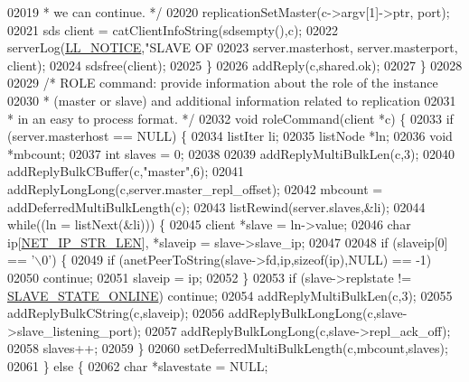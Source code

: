 \begin{DoxyCode}
{{{{{{{{{{{{{{{{{{{{{{{{{{{{{{{{{{{{{{{{{{{{{{{{{{{{{{{{{{{{{{{{{{{{{{{{02019 \textcolor{comment}{         * we can continue. */}
02020         replicationSetMaster(c->argv[1]->ptr, port);
02021         sds client = catClientInfoString(sdsempty(),c);
02022         serverLog(\hyperlink{server_8h_a8c54c191e436c7dd3012167212692401}{LL\_NOTICE},\textcolor{stringliteral}{"SLAVE OF %
02023             server.masterhost, server.masterport, client);
02024         sdsfree(client);
02025     \}
02026     addReply(c,shared.ok);
02027 \}
02028 
02029 \textcolor{comment}{/* ROLE command: provide information about the role of the instance}
02030 \textcolor{comment}{ * (master or slave) and additional information related to replication}
02031 \textcolor{comment}{ * in an easy to process format. */}
02032 \textcolor{keywordtype}{void} roleCommand(client *c) \{
02033     \textcolor{keywordflow}{if} (server.masterhost == NULL) \{
02034         listIter li;
02035         listNode *ln;
02036         \textcolor{keywordtype}{void} *mbcount;
02037         \textcolor{keywordtype}{int} slaves = 0;
02038 
02039         addReplyMultiBulkLen(c,3);
02040         addReplyBulkCBuffer(c,\textcolor{stringliteral}{"master"},6);
02041         addReplyLongLong(c,server.master\_repl\_offset);
02042         mbcount = addDeferredMultiBulkLength(c);
02043         listRewind(server.slaves,&li);
02044         \textcolor{keywordflow}{while}((ln = listNext(&li))) \{
02045             client *slave = ln->value;
02046             \textcolor{keywordtype}{char} ip[\hyperlink{server_8h_ad97c5405ed22a94e9fcc10fba577d6c0}{NET\_IP\_STR\_LEN}], *slaveip = slave->slave\_ip;
02047 
02048             \textcolor{keywordflow}{if} (slaveip[0] == \textcolor{stringliteral}{'\(\backslash\)0'}) \{
02049                 \textcolor{keywordflow}{if} (anetPeerToString(slave->fd,ip,\textcolor{keyword}{sizeof}(ip),NULL) == -1)
02050                     \textcolor{keywordflow}{continue};
02051                 slaveip = ip;
02052             \}
02053             \textcolor{keywordflow}{if} (slave->replstate != \hyperlink{server_8h_ad895fdf16e5ed5275d19ddf8578b900f}{SLAVE\_STATE\_ONLINE}) \textcolor{keywordflow}{continue};
02054             addReplyMultiBulkLen(c,3);
02055             addReplyBulkCString(c,slaveip);
02056             addReplyBulkLongLong(c,slave->slave\_listening\_port);
02057             addReplyBulkLongLong(c,slave->repl\_ack\_off);
02058             slaves++;
02059         \}
02060         setDeferredMultiBulkLength(c,mbcount,slaves);
02061     \} \textcolor{keywordflow}{else} \{
02062         \textcolor{keywordtype}{char} *slavestate = NULL;
}}}}}}}}}}}}}}}}}}}}}}}}}}}}}}}}}}}}}}}}}}}}}}}}}}}}}}}}}}}}}}}}}}}}}}}}}
\end{DoxyCode}
